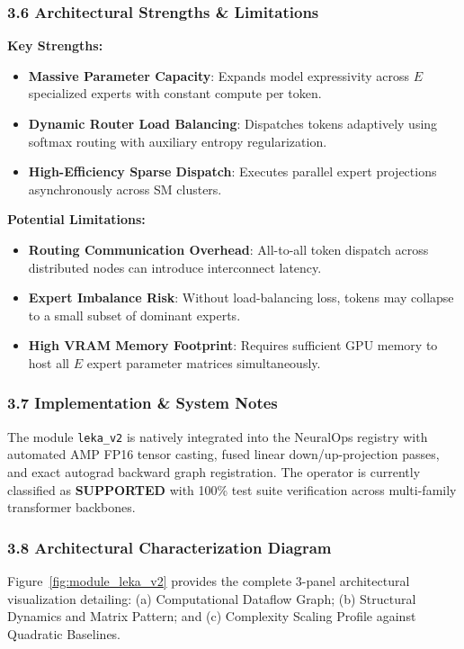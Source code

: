 \subsubsection*{3.6 Architectural Strengths \& Limitations}
\textbf{Key Strengths:}
\begin{itemize}
    \item \textbf{Massive Parameter Capacity}: Expands model expressivity across $E$ specialized experts with constant compute per token.
    \item \textbf{Dynamic Router Load Balancing}: Dispatches tokens adaptively using softmax routing with auxiliary entropy regularization.
    \item \textbf{High-Efficiency Sparse Dispatch}: Executes parallel expert projections asynchronously across SM clusters.
\end{itemize}

\textbf{Potential Limitations:}
\begin{itemize}
    \item \textbf{Routing Communication Overhead}: All-to-all token dispatch across distributed nodes can introduce interconnect latency.
    \item \textbf{Expert Imbalance Risk}: Without load-balancing loss, tokens may collapse to a small subset of dominant experts.
    \item \textbf{High VRAM Memory Footprint}: Requires sufficient GPU memory to host all $E$ expert parameter matrices simultaneously.
\end{itemize}

\subsubsection*{3.7 Implementation \& System Notes}
The module \texttt{leka\_v2} is natively integrated into the NeuralOps registry with automated AMP FP16 tensor casting, fused linear down/up-projection passes, and exact autograd backward graph registration. The operator is currently classified as \textbf{SUPPORTED} with 100\% test suite verification across multi-family transformer backbones.

\subsubsection*{3.8 Architectural Characterization Diagram}
Figure~\ref{fig:module_leka_v2} provides the complete 3-panel architectural visualization detailing: (a) Computational Dataflow Graph; (b) Structural Dynamics and Matrix Pattern; and (c) Complexity Scaling Profile against Quadratic Baselines.

